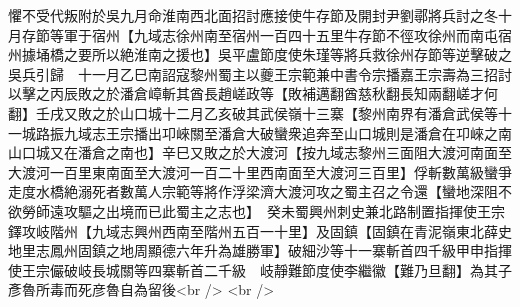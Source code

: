 懼不受代叛附於吳九月命淮南西北面招討應接使牛存節及開封尹劉鄩將兵討之冬十月存節等軍于宿州【九域志徐州南至宿州一百四十五里牛存節不徑攻徐州而南屯宿州據埇橋之要所以絶淮南之援也】吳平盧節度使朱瑾等將兵救徐州存節等逆擊破之吳兵引歸　十一月乙巳南詔寇黎州蜀主以夔王宗範兼中書令宗播嘉王宗壽為三招討以擊之丙辰敗之於潘倉嶂斬其酋長趙嵯政等【敗補邁翻酋慈秋翻長知兩翻嵯才何翻】壬戌又敗之於山口城十二月乙亥破其武侯嶺十三寨【黎州南界有潘倉武侯等十一城路振九域志王宗播出卭崍關至潘倉大破蠻衆追奔至山口城則是潘倉在卭崍之南山口城又在潘倉之南也】辛巳又敗之於大渡河【按九域志黎州三面阻大渡河南面至大渡河一百里東南面至大渡河一百二十里西南面至大渡河三百里】俘斬數萬級蠻爭走度水橋絶溺死者數萬人宗範等將作浮梁濟大渡河攻之蜀主召之令還【蠻地深阻不欲勞師遠攻驅之出境而已此蜀主之志也】　癸未蜀興州刺史兼北路制置指揮使王宗鐸攻岐階州【九域志興州西南至階州五百一十里】及固鎮【固鎮在青泥嶺東北薛史地里志鳳州固鎮之地周顯德六年升為雄勝軍】破細沙等十一寨斬首四千級甲申指揮使王宗儼破岐長城關等四寨斬首二千級　岐靜難節度使李繼徽【難乃旦翻】為其子彥魯所毒而死彦魯自為留後<br />
<br />
